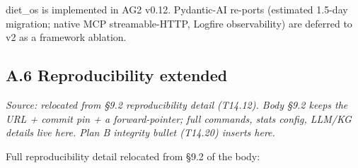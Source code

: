 \documentclass[
]{article}
\begin{document}
diet\_os is implemented in AG2 v0.12. Pydantic-AI re-ports (estimated
1.5-day migration; native MCP streamable-HTTP, Logfire observability)
are deferred to v2 as a framework ablation.

\hypertarget{a.6-reproducibility-extended}{%
\subsection{A.6 Reproducibility
extended}\label{a.6-reproducibility-extended}}

\emph{Source: relocated from §9.2 reproducibility detail (T14.12). Body
§9.2 keeps the URL + commit pin + a forward-pointer; full commands,
stats config, LLM/KG details live here. Plan B integrity bullet (T14.20)
inserts here.}

Full reproducibility detail relocated from §9.2 of the body:
\end{document}
